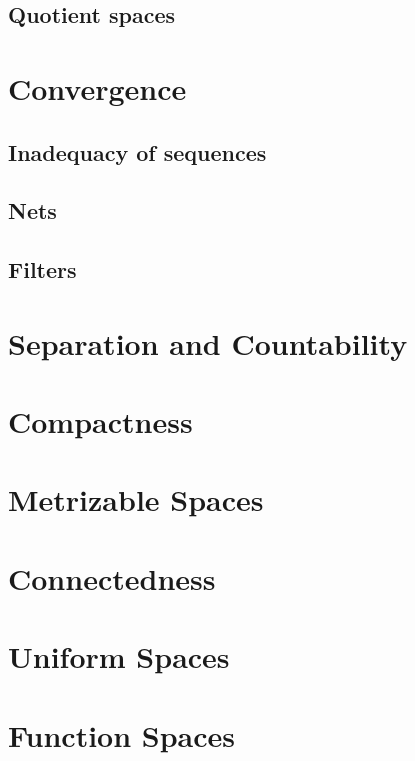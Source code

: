 \documentclass[12pt,oneside]{book}
\theoremstyle{definition}
\begin{document}
\section{Quotient spaces}

\chapter{Convergence}

\section{Inadequacy of sequences}

\section{Nets}

\section{Filters}

\chapter{Separation and Countability}

\chapter{Compactness}

\chapter{Metrizable Spaces}

\chapter{Connectedness}

\chapter{Uniform Spaces}

\chapter{Function Spaces}
\end{document}
